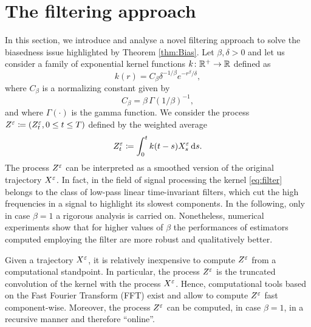 \documentclass[10pt]{article}
\begin{document}
\section{The filtering approach}\label{sec:Filter}

In this section, we introduce and analyse a novel filtering approach to solve the biasedness issue highlighted by Theorem \ref{thm:Bias}. Let $\beta, \delta > 0$ and let us consider a family of exponential kernel functions $k \colon \mathbb{R}^+ \to \mathbb{R}$ defined as
\begin{equation}\label{eq:filter}
k(r) = C_\beta \delta^{-1/\beta} e^{-r^\beta/\delta},
\end{equation}
where $C_{\beta}$ is a normalizing constant given by
\begin{equation}
C_\beta = \beta \, \Gamma(1/\beta)^{-1},
\end{equation}
and where $\Gamma(\cdot)$ is the gamma function. We consider the process $Z^\varepsilon \coloneqq (Z^\varepsilon_t, 0 \leq t \leq T)$ defined by the weighted average
\begin{equation}\label{eq:ZDef}
	Z^{\varepsilon}_t \coloneqq \int_0^t k(t - s)X^\varepsilon_s \,\mathrm{d} s.
\end{equation}
The process $Z^\varepsilon$ can be interpreted as a smoothed version of the original trajectory $X^\varepsilon$. In fact, in the field of signal processing the kernel \eqref{eq:filter} belongs to the class of low-pass linear time-invariant filters, which cut the high frequencies in a signal to highlight its slowest components. In the following, only in case $\beta = 1$ a rigorous analysis is carried on. Nonetheless, numerical experiments show that for higher values of $\beta$ the performances of estimators computed employing the filter are more robust and qualitatively better. 

\begin{remark} Given a trajectory $X^\varepsilon$, it is relatively inexpensive to compute $Z^\varepsilon$ from a computational standpoint. In particular, the process $Z^\varepsilon$ is the truncated convolution of the kernel with the process $X^\varepsilon$. Hence, computational tools based on the Fast Fourier Transform (FFT) exist and allow to compute $Z^\varepsilon$ fast component-wise. Moreover, the process $Z^\varepsilon$ can be computed, in case $\beta = 1$, in a recursive manner and therefore ``online''.
\end{remark}
\end{document}
